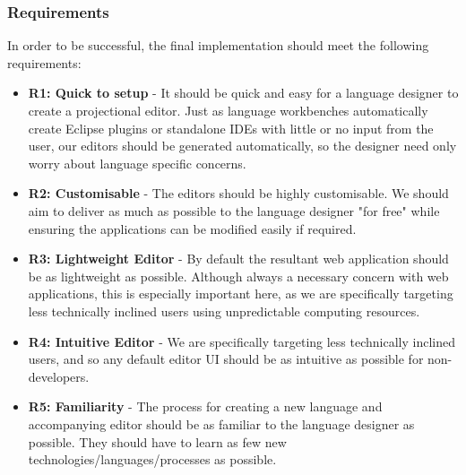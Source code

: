 \documentclass{article}
\begin{document}
\subsubsection{Requirements}\label{requirements}
In order to be successful, the final implementation should meet the following requirements: 

\begin{itemize}
\item \textbf{R1: Quick to setup} - It should be quick and easy for a language designer to create a projectional editor. Just as language workbenches automatically create Eclipse plugins or standalone IDEs with little or no input from the user, our editors should be generated automatically, so the designer need only worry about language specific concerns.
\item \textbf{R2: Customisable} - The editors should be highly customisable. We should aim to deliver as much as possible to the language designer "for free" while ensuring the applications can be modified easily if required. 
\item \textbf{R3: Lightweight Editor} - By default the resultant web application should be as lightweight as possible. Although always a necessary concern with web applications, this is especially important here, as we are specifically targeting less technically inclined users using unpredictable computing resources.
\item \textbf{R4: Intuitive Editor} - We are specifically targeting less technically inclined users, and so any default editor UI should be as intuitive as possible for non-developers.
\item \textbf{R5: Familiarity} - The process for creating a new language and accompanying editor should be as familiar to the language designer as possible. They should have to learn as few new technologies/languages/processes as possible.
\end{itemize}
\end{document}
